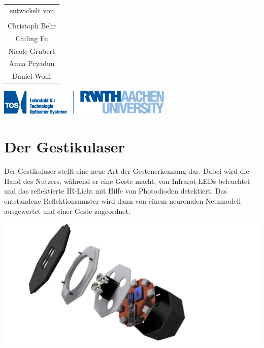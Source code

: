 \documentclass[a4paper,12pt,notumble]{leaflet}
\begin{document}
\begin{center}
\begin{tabular}{c}
	entwickelt von \\ \\
	Christoph Behr \\
	Cailing Fu \\
	Nicole Grubert \\
	Anna Pryadun \\
	Daniel Wolff
\end{tabular}

\vfill

\includegraphics[height=1.25cm]{../Logos/TOS.eps}

\end{center}

\newpage
\raggedright



\noindent
\begin{minipage}[c][0.58\textheight][t]{\textwidth}

	\section{Der Gestikulaser}

	Der Gestikulaser stellt eine neue Art der Gestenerkennung dar. Dabei wird die Hand des Nutzers, während er eine Geste macht, von Infrarot-LEDs beleuchtet und 
	das reflektierte IR-Licht mit Hilfe von Photodioden detektiert. Das entstandene Reflektionsmuster wird dann von einem neuronalen Netzmodell ausgewertet und 
	einer Geste zugeordnet. 
	
	\vspace{0.5cm}

	\centering
	\includegraphics[scale=0.3]{../CAD_Bilder/Oktokommander/Oktokommander_raytraced.png}
	
	\vfill
	
\end{minipage}
\end{document}
